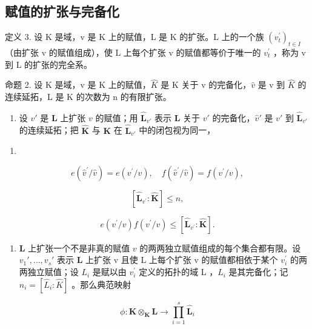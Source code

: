 \subsection{赋值的扩张与完备化}

定义 3. 设 K 是域，v 是 K 上的赋值，L 是 K 的扩张。L 上的一个族 \((v_{t}^{\prime})_{t\in I}\) （由扩张 v 的赋值组成），使 L 上每个扩张 v 的赋值都等价于唯一的 \(v_{t}^{\prime}\) ，称为 v 到 L 的扩张的完全系。

命题 2. 设 K 是域，v 是 K 上的赋值，\(\hat{K}\) 是 K 关于 v 的完备化，\(\hat{v}\) 是 v 到 \(\hat{K}\) 的连续延拓，L 是 K 的次数为 n 的有限扩张。

\begin{enumerate}
\def\labelenumi{(\alph{enumi})}
\tightlist
\item
  设 \(v'\) 是 \(\mathbf{L}\) 上扩张 \(v\) 的赋值；用 \(\hat{\mathbf{L}}_{v'}\) 表示 \(\mathbf{L}\) 关于 \(v'\) 的完备化，\(\hat{v}'\) 是 \(v'\) 到 \(\hat{\mathbf{L}}_{v'}\) 的连续延拓；把 \(\hat{\mathbf{K}}\) 与 \(\mathbf{K}\) 在 \(\hat{\mathbf{L}}_{v'}\) 中的闭包视为同一，
\end{enumerate}

\begin{enumerate}
\def\labelenumi{(\arabic{enumi})}
\setcounter{enumi}{3}
\tightlist
\item
\end{enumerate}

\[
e (\hat {v} ^ {\prime} / \hat {v}) = e (v ^ {\prime} / v), \quad f (\hat {v} ^ {\prime} / \hat {v}) = f (v ^ {\prime} / v),\tag{5}
\]

\[
[ \hat {\mathbf {L}} _ {v ^ {\prime}}: \hat {\mathbf {K}} ] \leqslant n,\tag{6}
\]

\[
e (v ^ {\prime} / v) f (v ^ {\prime} / v) \leqslant [ \hat {\mathbf {L}} _ {v ^ {\prime}}: \hat {\mathbf {K}} ].
\]

\begin{enumerate}
\def\labelenumi{(\alph{enumi})}
\setcounter{enumi}{1}
\tightlist
\item
  \(\mathbf{L}\) 上扩张一个不是非真的赋值 \(v\) 的两两独立赋值组成的每个集合都有限。设 \(v_{1}',\ldots ,v_{s}'\) 表示 \(\mathbf{L}\) 上扩张 v 且使 L 上每个扩张 v 的赋值都相依于某个 \(v_{i}^{\prime}\) 的两两独立赋值；设 \(L_{i}\) 是赋以由 \(v_{i}^{\prime}\) 定义的拓扑的域 L ，\(\hat{L}_{i}\) 是其完备化；记 \(n_{i} = [\hat{L}_{i}: \hat{K}]\) 。那么典范映射
\end{enumerate}

\[
\phi : \hat {\mathbf {K}} \otimes_ {\mathbf {K}} \mathbf {L} \rightarrow \prod_ {i = 1} ^ {s} \hat {\mathbf {L}} _ {i}
\]

